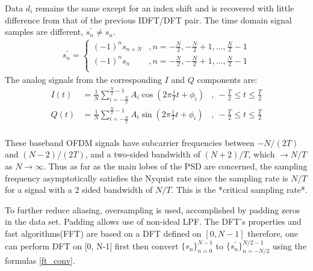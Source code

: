 Data $d_i$ remains the same except for an index shift and is recovered with little difference from that of the previous \gls{IDFT}/\gls{DFT} pair. The time domain signal samples are different, $s_n^\prime \neq s_n$.
\begin{align}
\label{ft_conv}
s_n^\prime = \begin{cases}
(-1)^ns_{n+N}&, n=-\frac{N}{2},-\frac{N}{2}+1,\ldots,\frac{N}{2}-1\\
(-1)^ns_n&, n=-\frac{N}{2},-\frac{N}{2}+1,\ldots,\frac{N}{2}-1\\
\end{cases}
\end{align}
The analog signals from the corresponding $I$ and $Q$ components are:
\begin{align*}
I(t) &= \frac{1}{N}\sum_{i=-\frac{N}{2}}^{\frac{N}{2}-1}A_i\cos\left( 2\pi\frac{i}{T}t+\phi_i\right)&,\ -\frac{T}{2}\leq t\leq \frac{T}{2}\\
Q(t) &= \frac{1}{N}\sum_{i=-\frac{N}{2}}^{\frac{N}{2}-1}A_i\sin\left( 2\pi\frac{i}{T}t+\phi_i\right)&,\ -\frac{T}{2}\leq t\leq \frac{T}{2}\\
\end{align*}

These baseband OFDM signals have subcarrier frequencies between $-N/(2T)$ and $(N-2)/(2T)$, and a two-sided bandwidth of $(N+2)/T$, which $\to N/T$ as $N\to\infty$. Thus as far as the main lobes of the PSD are concerned, the sampling frequency asymptotically satisfies the Nyquist rate since the sampling rate is $N/T$ for a signal with a 2 sided bandwidth of $N/T$. This is the *critical sampling rate*.

To further reduce aliasing, oversampling is used, accomplished by padding zeros in the data set. Padding allows use of non-ideal LPF. The \gls{DFT}'s properties and fast algorithms(\gls{FFT}) are based on a \gls{DFT} defined on $[0, N-1]$ therefore, one can perform \gls{DFT} on [0, N-1] first then convert $\{ s_n\}^{N-1}_{n=0}$ to $\{s_n^\prime\}^{N/2-1}_{n=-N/2}$ using the formulas \eqref{ft_conv}.

